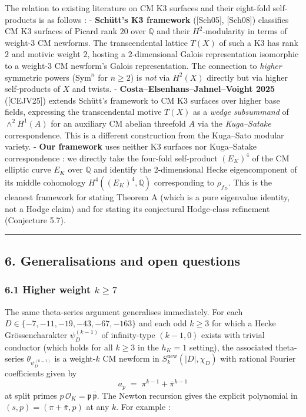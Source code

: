 \documentclass[
  11pt,
  a4paper,
]{amsart}
\begin{document}
The relation to existing literature on CM K3 surfaces and their eight-fold self-products is as follows :
- \textbf{Schütt's K3 framework} ({[}Sch05{]}, {[}Sch08{]}) classifies CM K3 surfaces of Picard rank \(20\) over \(\mathbb{Q}\) and their \(H^2\)-modularity in terms of weight-\(3\) CM newforms. The transcendental lattice \(T(X)\) of such a K3 has rank \(2\) and motivic weight \(2\), hosting a \(2\)-dimensional Galois representation isomorphic to a weight-\(3\) CM newform's Galois representation. The connection to \emph{higher} symmetric powers (\(\mathrm{Sym}^n\) for \(n \geq 2\)) is \emph{not} via \(H^2(X)\) directly but via higher self-products of \(X\) and twists.
- \textbf{Costa--Elsenhans--Jahnel--Voight 2025} ({[}CEJV25{]}) extends Schütt's framework to CM K3 surfaces over higher base fields, expressing the transcendental motive \(T(X)\) as a \emph{wedge subsummand} of \(\wedge^2 H^1(A)\) for an auxiliary CM abelian threefold \(A\) via the \emph{Kuga--Satake} correspondence. This is a different construction from the Kuga--Sato modular variety.
- \textbf{Our framework} uses neither K3 surfaces nor Kuga--Satake correspondence : we directly take the four-fold self-product \((E_K)^4\) of the CM elliptic curve \(E_K\) over \(\mathbb{Q}\) and identify the \(2\)-dimensional Hecke eigencomponent of its middle cohomology \(H^4((E_K)^4, \mathbb{Q})\) corresponding to \(\rho_{f_D}\). This is the cleanest framework for stating Theorem A (which is a pure eigenvalue identity, not a Hodge claim) and for stating its conjectural Hodge-class refinement (Conjecture 5.7).

\begin{center}\rule{0.5\linewidth}{0.5pt}\end{center}

\hypertarget{generalisations-and-open-questions}{%
\subsection{6. Generalisations and open questions}\label{generalisations-and-open-questions}}

\hypertarget{higher-weight-k-geq-7}{%
\subsubsection{\texorpdfstring{6.1 Higher weight \(k \geq 7\)}{6.1 Higher weight k \textbackslash geq 7}}\label{higher-weight-k-geq-7}}

The same theta-series argument generalises immediately. For each \(D \in \{-7, -11, -19, -43, -67, -163\}\) and each odd \(k \geq 3\) for which a Hecke Grössencharakter \(\psi_D^{(k - 1)}\) of infinity-type \((k - 1, 0)\) exists with trivial conductor (which holds for all \(k \geq 3\) in the \(h_K = 1\) setting), the associated theta-series \(\theta_{\psi_D^{(k-1)}}\) is a weight-\(k\) CM newform in \(S_k^{\mathrm{new}}(|D|, \chi_D)\) with rational Fourier coefficients given by
\[
a_p \;=\; \pi^{k - 1} + \bar\pi^{k - 1}
\]
at split primes \(p\,\mathcal{O}_K = \mathfrak{p}\,\bar{\mathfrak{p}}\). The Newton recursion gives the explicit polynomial in \((s, p) = (\pi + \bar\pi, p)\) at any \(k\). For example :
\end{document}
